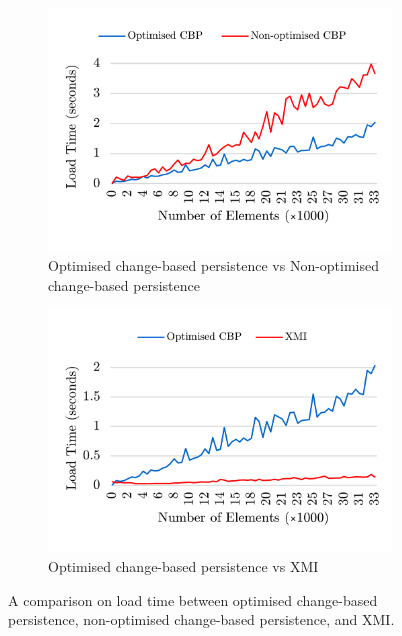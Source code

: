 \documentclass[12pt, a4paper]{report} \usepackage[titletoc]{appendix}
\begin{document}
\begin{figure}[ht]	
	\begin{subfigure}[t]{0.5\linewidth}
		\includegraphics[width=\linewidth]{loading_speed_conf}
		\caption{Optimised change-based persistence vs Non-optimised change-based persistence}\label{fig:loading_speed_conf}
	\end{subfigure}
	\hfill
	\begin{subfigure}[t]{0.5\linewidth}
		\includegraphics[width=\linewidth]{loading_speed_conf_ocbp_xmi}
		\caption{Optimised change-based persistence vs XMI}\label{fig:loading_speed_conf_ochange-based persistence_xmi}		
	\end{subfigure}	
	\caption{A comparison on load time between optimised change-based persistence, non-optimised change-based persistence, and XMI.}
	\label{fig:loading_speed}
\end{figure}
\end{document}
